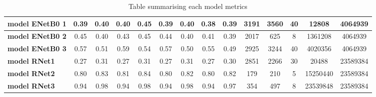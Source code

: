 \begin{table}[ht]
{\begin{tabular}{l|cc|cc|cc|cc|cc|ccc}
\multicolumn{1}{|l|}{\cellcolor[HTML]{EFEFEF}\textbf{model ENetB0 1}} & \multicolumn{1}{c|}{0.39} & 0.40 & \multicolumn{1}{c|}{0.40} & 0.45 & \multicolumn{1}{c|}{0.39} & 0.40 & \multicolumn{1}{c|}{0.38} & 0.39 & \multicolumn{1}{c|}{3191} & 3560 & \multicolumn{1}{c|}{40} & \multicolumn{1}{c|}{12808} & \multicolumn{1}{c|}{4064939} \\ \hline
\multicolumn{1}{|l|}{\cellcolor[HTML]{EFEFEF}\textbf{model ENetB0 2}} & \multicolumn{1}{c|}{0.45} & 0.40 & \multicolumn{1}{c|}{0.43} & 0.45 & \multicolumn{1}{c|}{0.44} & 0.40 & \multicolumn{1}{c|}{0.41} & 0.39 & \multicolumn{1}{c|}{2017} & 625 & \multicolumn{1}{c|}{8} & \multicolumn{1}{c|}{1361208} & \multicolumn{1}{c|}{4064939} \\ \hline
\multicolumn{1}{|l|}{\cellcolor[HTML]{EFEFEF}\textbf{model ENetB0 3}} & \multicolumn{1}{c|}{0.57} & 0.51 & \multicolumn{1}{c|}{0.59} & 0.54 & \multicolumn{1}{c|}{0.57} & 0.50 & \multicolumn{1}{c|}{0.55} & 0.49 & \multicolumn{1}{c|}{2925} & 3244 & \multicolumn{1}{c|}{40} & \multicolumn{1}{c|}{4020356} & \multicolumn{1}{c|}{4064939} \\ \hline
\multicolumn{1}{|l|}{\cellcolor[HTML]{EFEFEF}\textbf{model RNet1}} & \multicolumn{1}{c|}{0.27} & 0.31 & \multicolumn{1}{c|}{0.27} & 0.31 & \multicolumn{1}{c|}{0.27} & 0.31 & \multicolumn{1}{c|}{0.27} & 0.30 & \multicolumn{1}{c|}{2851} & 2266 & \multicolumn{1}{c|}{30} & \multicolumn{1}{c|}{20488} & \multicolumn{1}{c|}{23589384} \\ \hline
\multicolumn{1}{|l|}{\cellcolor[HTML]{EFEFEF}\textbf{model RNet2}} & \multicolumn{1}{c|}{0.80} & 0.83 & \multicolumn{1}{c|}{0.81} & 0.84 & \multicolumn{1}{c|}{0.80} & 0.82 & \multicolumn{1}{c|}{0.80} & 0.82 & \multicolumn{1}{c|}{179} & 210 & \multicolumn{1}{c|}{5} & \multicolumn{1}{c|}{15250440} & \multicolumn{1}{c|}{23589384} \\ \hline
\multicolumn{1}{|l|}{\cellcolor[HTML]{EFEFEF}\textbf{model RNet3}} & \multicolumn{1}{c|}{0.94} & 0.98 & \multicolumn{1}{c|}{0.94} & 0.98 & \multicolumn{1}{c|}{0.94} & 0.98 & \multicolumn{1}{c|}{0.94} & 0.97 & \multicolumn{1}{c|}{354} & 497 & \multicolumn{1}{c|}{8} & \multicolumn{1}{c|}{23539848} & \multicolumn{1}{c|}{23589384} \\ \hline
\end{tabular}%
}
    \caption{Table summarising  each model metrics}
    \label{tbl: Metrics summary}
\end{table}


